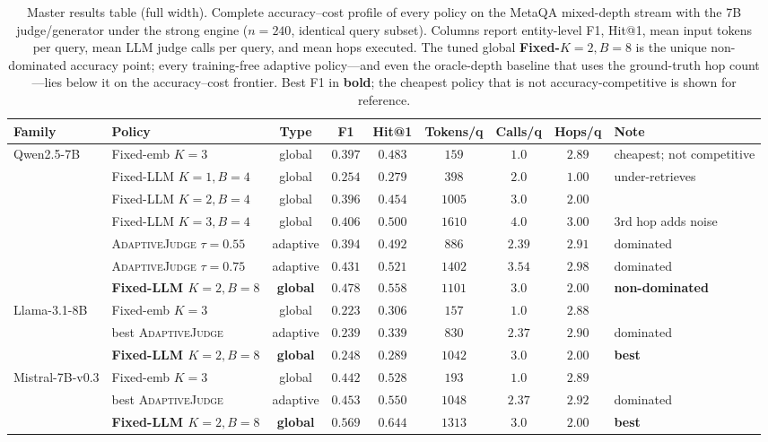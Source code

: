 \begin{table}[t]
\centering
\caption{Master results table (full width). Complete accuracy--cost profile of every policy on the MetaQA mixed-depth stream with the 7B judge/generator under the strong engine ($n{=}240$, identical query subset). Columns report entity-level F1, Hit@1, mean input tokens per query, mean LLM judge calls per query, and mean hops executed. The tuned global \textbf{Fixed-$K{=}2,B{=}8$} is the unique non-dominated accuracy point; every training-free adaptive policy---and even the oracle-depth baseline that uses the ground-truth hop count---lies below it on the accuracy--cost frontier. Best F1 in \textbf{bold}; the cheapest policy that is not accuracy-competitive is shown for reference.}
\label{tab:master}
\small
\begin{tabular}{@{}llccccccl@{}}
\toprule
\textbf{Family} & \textbf{Policy} & \textbf{Type} & \textbf{F1} & \textbf{Hit@1} & \textbf{Tokens/q} & \textbf{Calls/q} & \textbf{Hops/q} & \textbf{Note} \\
\midrule
\multirow{7}{*}{Qwen2.5-7B}
 & Fixed-emb $K{=}3$          & global   & $0.397$ & $0.483$ & $159$  & $1.0$ & $2.89$ & cheapest; not competitive \\
 & Fixed-LLM $K{=}1,B{=}4$    & global   & $0.254$ & $0.279$ & $398$  & $2.0$ & $1.00$ & under-retrieves \\
 & Fixed-LLM $K{=}2,B{=}4$    & global   & $0.396$ & $0.454$ & $1005$ & $3.0$ & $2.00$ & \\
 & Fixed-LLM $K{=}3,B{=}4$    & global   & $0.406$ & $0.500$ & $1610$ & $4.0$ & $3.00$ & 3rd hop adds noise \\
 & \textsc{AdaptiveJudge} $\tau{=}0.55$ & adaptive & $0.394$ & $0.492$ & $886$  & $2.39$ & $2.91$ & dominated \\
 & \textsc{AdaptiveJudge} $\tau{=}0.75$ & adaptive & $0.431$ & $0.521$ & $1402$ & $3.54$ & $2.98$ & dominated \\
 & \textbf{Fixed-LLM $K{=}2,B{=}8$}     & \textbf{global}   & $\mathbf{0.478}$ & $\mathbf{0.558}$ & $1101$ & $3.0$ & $2.00$ & \textbf{non-dominated} \\
\midrule
\multirow{3}{*}{Llama-3.1-8B}
 & Fixed-emb $K{=}3$          & global   & $0.223$ & $0.306$ & $157$  & $1.0$ & $2.88$ & \\
 & best \textsc{AdaptiveJudge} & adaptive & $0.239$ & $0.339$ & $830$  & $2.37$ & $2.90$ & dominated \\
 & \textbf{Fixed-LLM $K{=}2,B{=}8$}     & \textbf{global}   & $\mathbf{0.248}$ & $0.289$ & $1042$ & $3.0$ & $2.00$ & \textbf{best} \\
\midrule
\multirow{3}{*}{Mistral-7B-v0.3}
 & Fixed-emb $K{=}3$          & global   & $0.442$ & $0.528$ & $193$  & $1.0$ & $2.89$ & \\
 & best \textsc{AdaptiveJudge} & adaptive & $0.453$ & $0.550$ & $1048$ & $2.37$ & $2.92$ & dominated \\
 & \textbf{Fixed-LLM $K{=}2,B{=}8$}     & \textbf{global}   & $\mathbf{0.569}$ & $\mathbf{0.644}$ & $1313$ & $3.0$ & $2.00$ & \textbf{best} \\
\bottomrule
\end{tabular}
\end{table}
